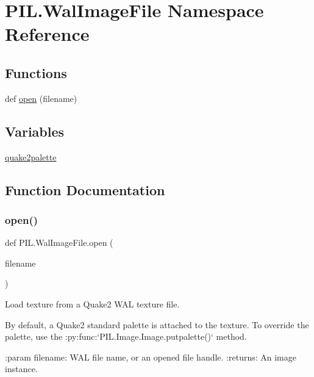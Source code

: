 \hypertarget{namespacePIL_1_1WalImageFile}{}\section{P\+I\+L.\+Wal\+Image\+File Namespace Reference}
\label{namespacePIL_1_1WalImageFile}
\subsection*{Functions}
\begin{DoxyCompactItemize}
\item 
def \hyperlink{namespacePIL_1_1WalImageFile_a0381ba7cdb6e001830825947154f30c5}{open} (filename)
\end{DoxyCompactItemize}
\subsection*{Variables}
\begin{DoxyCompactItemize}
\item 
\hyperlink{namespacePIL_1_1WalImageFile_adbb0323d24c82c87e0752c40d01b1c96}{quake2palette}
\end{DoxyCompactItemize}


\subsection{Function Documentation}
\mbox{\label{namespacePIL_1_1WalImageFile_a0381ba7cdb6e001830825947154f30c5}} 
\subsubsection{\texorpdfstring{open()}{open()}}
{\footnotesize\ttfamily def P\+I\+L.\+Wal\+Image\+File.\+open (\begin{DoxyParamCaption}\item[{}]{filename }\end{DoxyParamCaption})}

\begin{DoxyVerb}Load texture from a Quake2 WAL texture file.

By default, a Quake2 standard palette is attached to the texture.
To override the palette, use the :py:func:`PIL.Image.Image.putpalette()` method.

:param filename: WAL file name, or an opened file handle.
:returns: An image instance.
\end{DoxyVerb}
 

